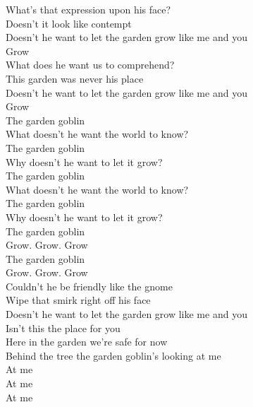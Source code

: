What's that expression upon his face? \\
Doesn't it look like contempt \\
Doesn't he want to let the garden grow like me and you \\

Grow \\

What does he want us to comprehend? \\
This garden was never his place \\
Doesn't he want to let the garden grow like me and you \\

Grow \\

The garden goblin \\
What doesn't he want the world to know? \\
The garden goblin \\
Why doesn't he want to let it grow? \\
The garden goblin \\
What doesn't he want the world to know? \\
The garden goblin \\
Why doesn't he want to let it grow? \\
The garden goblin \\
Grow. Grow. Grow \\
The garden goblin \\
Grow. Grow. Grow \\

Couldn't he be friendly like the gnome \\
Wipe that smirk right off his face \\
Doesn't he want to let the garden grow like me and you \\

Isn't this the place for you \\
Here in the garden we're safe for now \\
Behind the tree the garden goblin's looking at me \\
At me \\
At me \\
At me \\




